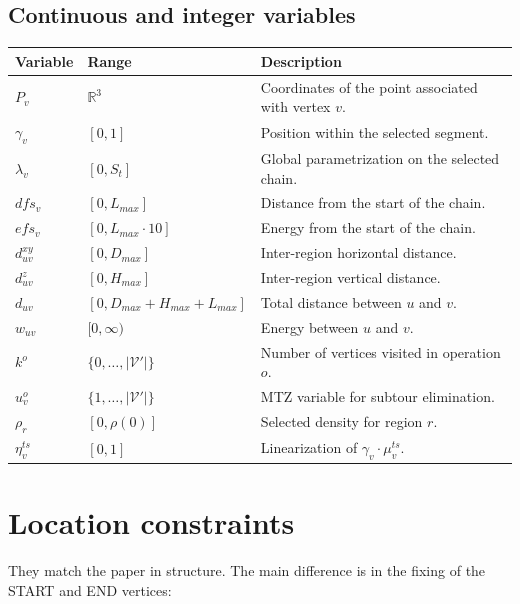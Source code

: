 \documentclass[12pt]{article}
\begin{document}
\subsection{Continuous and integer variables}
\begin{center}
\begin{tabular}{lll}
\toprule
Variable & Range & Description \\
\midrule
$P_v$ & $\mathbb R^3$ & Coordinates of the point associated with vertex $v$. \\
$\gamma_v$ & $[0,1]$ & Position within the selected segment. \\
$\lambda_v$ & $[0, S_t]$ & Global parametrization on the selected chain. \\
$dfs_v$ & $[0, L_{max}]$ & Distance from the start of the chain. \\
$efs_v$ & $[0, L_{max}\cdot 10]$ & Energy from the start of the chain. \\
$d_{uv}^{xy}$ & $[0, D_{max}]$ & Inter-region horizontal distance. \\
$d_{uv}^z$ & $[0, H_{max}]$ & Inter-region vertical distance. \\
$d_{uv}$ & $[0, D_{max}+H_{max}+L_{max}]$ & Total distance between $u$ and $v$. \\
$w_{uv}$ & $[0, \infty)$ & Energy between $u$ and $v$. \\
$k^o$ & $\{0,\dots,|\mathcal V'|\}$ & Number of vertices visited in operation $o$. \\
$u_v^o$ & $\{1,\dots,|\mathcal V'|\}$ & MTZ variable for subtour elimination. \\
$\rho_r$ & $[0,\rho(0)]$ & Selected density for region $r$. \\
$\eta_v^{ts}$ & $[0,1]$ & Linearization of $\gamma_v\cdot\mu_v^{ts}$. \\
\bottomrule
\end{tabular}
\end{center}

\section{Location constraints}

They match the paper in structure. The main difference is in the fixing
of the START and END vertices:
\end{document}
